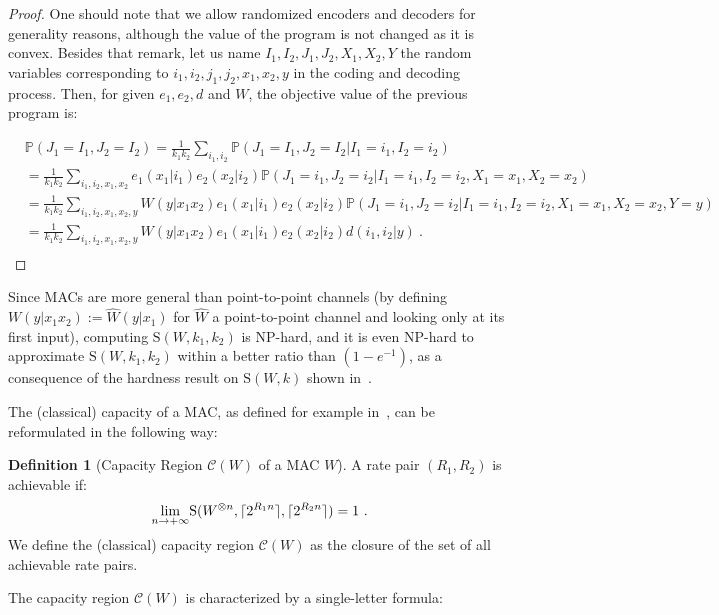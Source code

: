 \documentclass[11pt]{article}
\theoremstyle{definition}
\newtheorem{defi}[theo]{Definition}
\theoremstyle{remark}
\DeclarePairedDelimiter\ceil{\lceil}{\rceil}
\begin{document}
\begin{proof}
One should note that we allow randomized encoders and decoders for generality reasons, although the value of the program is not changed as it is convex. Besides that remark, let us name $I_1,I_2,J_1,J_2,X_1,X_2,Y$ the random variables corresponding to $i_1,i_2,j_1,j_2,x_1,x_2,y$ in the coding and decoding process. Then, for given $e_1,e_2,d$ and $W$, the objective value of the previous program is:

\begin{equation*}
  \begin{aligned}
    &\mathbb{P}\left(J_1 = I_1, J_2 = I_2\right) = \frac{1}{k_1k_2}\sum_{i_1,i_2} \mathbb{P}\left(J_1 = I_1, J_2 = I_2|I_1=i_1,I_2=i_2\right)\\
    &= \frac{1}{k_1k_2}\sum_{i_1,i_2,x_1,x_2}e_1(x_1|i_1)e_2(x_2|i_2) \mathbb{P}\left(J_1 = i_1, J_2 = i_2|I_1=i_1,I_2=i_2,X_1=x_1,X_2=x_2\right)\\
    &= \frac{1}{k_1k_2}\sum_{i_1,i_2,x_1,x_2,y}W(y|x_1x_2)e_1(x_1|i_1)e_2(x_2|i_2) \mathbb{P}\left(J_1 = i_1,J_2=i_2|I_1=i_1,I_2=i_2,X_1=x_1,X_2=x_2,Y=y\right)\\
    &= \frac{1}{k_1k_2}\sum_{i_1,i_2,x_1,x_2,y}W(y|x_1x_2)e_1(x_1|i_1)e_2(x_2|i_2)d(i_1,i_2|y) \ .\\
  \end{aligned}
\end{equation*}
\end{proof}

Since MACs are more general than point-to-point channels (by defining $W(y|x_1x_2):=\hat{W}(y|x_1)$ for $\hat{W}$ a point-to-point channel and looking only at its first input), computing $\mathrm{S}(W,k_1,k_2)$ is \textrm{NP}-hard, and it is even \textrm{NP}-hard to approximate $\mathrm{S}(W,k_1,k_2)$ within a better ratio than $\left(1-e^{-1}\right)$, as a consequence of the hardness result on $\mathrm{S}(W,k)$ shown in~\cite{BF18}.

The (classical) capacity of a MAC, as defined for example in~\cite{CT01}, can be reformulated in the following way:
\begin{defi}[Capacity Region $\mathcal{C}(W)$ of a MAC $W$]
  A rate pair $(R_1,R_2)$ is achievable if:
  \[ \underset{n \rightarrow +\infty}{\lim} \mathrm{S}(W^{\otimes n},\ceil{2^{R_1n}},\ceil{2^{R_2n}}) = 1 \ . \]
  We define the (classical) capacity region $\mathcal{C}(W)$ as the closure of the set of all achievable rate pairs.
\end{defi}

The capacity region $\mathcal{C}(W)$ is characterized by a single-letter formula:
\end{document}
